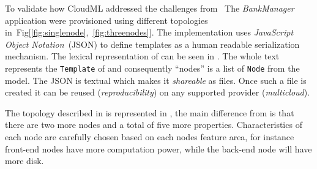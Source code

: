 


To validate how CloudML addressed the challenges from~
The \emph{BankManager} application were provisioned using different topologies in~Fig[\ref{fig:singlenode},~\ref{fig:threenodes}].
The implementation uses \emph{JavaScript Object Notation}~(JSON) to define templates
as a human readable serialization mechanism.
The lexical representation of  can be seen in . 
The whole text represents the \texttt{Template} of  and consequently 
``nodes'' is a list of \texttt{Node} from the model.
The JSON is textual which makes it \emph{shareable} as files.
Once such a file is created it can be reused (\emph{reproducibility}) 
on any supported provider (\emph{multicloud}).


The topology described in  is represented in ,
the main difference from  is that there are two more nodes and a total of 
five more properties.
Characteristics of each node are carefully chosen based on each nodes feature area, for instance 
front-end nodes have more computation power, while the back-end node will have more disk.

